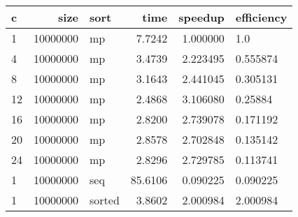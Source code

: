\begin{tabular}{lrlrrl}
\toprule
 c &     size &   sort &    time &  speedup & efficiency \\
\midrule
 1 & 10000000 &     mp &  7.7242 & 1.000000 &        1.0 \\
 4 & 10000000 &     mp &  3.4739 & 2.223495 &   0.555874 \\
 8 & 10000000 &     mp &  3.1643 & 2.441045 &   0.305131 \\
12 & 10000000 &     mp &  2.4868 & 3.106080 &    0.25884 \\
16 & 10000000 &     mp &  2.8200 & 2.739078 &   0.171192 \\
20 & 10000000 &     mp &  2.8578 & 2.702848 &   0.135142 \\
24 & 10000000 &     mp &  2.8296 & 2.729785 &   0.113741 \\
 1 & 10000000 &    seq & 85.6106 & 0.090225 &   0.090225 \\
 1 & 10000000 & sorted &  3.8602 & 2.000984 &   2.000984 \\
\bottomrule
\end{tabular}
